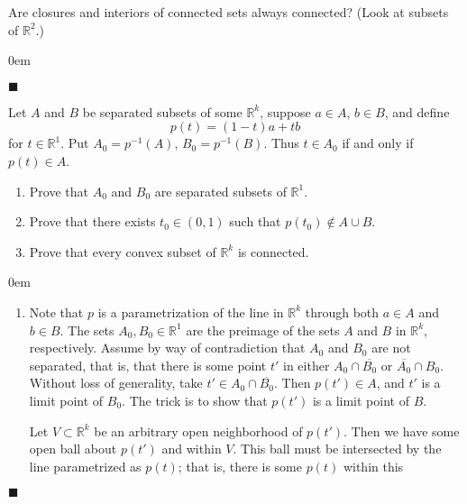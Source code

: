 \documentclass[12pt]{article}
\renewcommand{\qed}{\hfill$\blacksquare$}
\renewenvironment{proof}{\begin{addmargin}[1em]{0em}\begin{newproof}}{\end{newproof}\end{addmargin}\qed}
\newenvironment{problem}[2][Exercise]{\begin{trivlist}
\item[\hskip \labelsep {\bfseries #1}\hskip \labelsep {\bfseries #2.}]}{\end{trivlist}}
\begin{document}
\begin{problem}{2.20}
Are closures and interiors of connected sets always connected? (Look at subsets of $\mathbb{R}^2$.)
\end{problem}
\begin{proof}

\end{proof}





\begin{problem}{2.21}
Let $A$ and $B$ be separated subsets of some $\mathbb{R}^k$, suppose $a\in A$, $b \in B$, and define $$ p\left(t\right) = \left(1-t\right)a + tb$$ for $t \in \mathbb{R}^1$. Put $A_0 = p^{-1}\left(A\right)$, $B_0 = p^{-1}\left(B\right)$. Thus $t\in A_0$ if and only if $p\left(t\right) \in A$.
\begin{enumerate}[label=(\alph*)]
	\item Prove that $A_0$ and $B_0$ are separated subsets of $\mathbb{R}^1$. \\
	\item Prove that there exists $t_0 \in \left(0,1\right)$ such that $p\left(t_0\right) \notin A\cup B$. \\
	\item Prove that every convex subset of $\mathbb{R}^k$ is connected.
\end{enumerate}
\end{problem}
\begin{proof}
\begin{enumerate}[label=(\alph*)]
	\item Note that $p$ is a parametrization of the line in $\mathbb{R}^k$ through both $a\in A$ and $b\in B$. The sets $A_0, B_0 \in \mathbb{R}^1$ are the preimage of the sets $A$ and $B$ in $\mathbb{R}^k$, respectively. Assume by way of contradiction that $A_0$ and $B_0$ are not separated, that is, that there is some point $t'$ in either $A_0 \cap \overline{B_0}$ or $\overline{A_0}\cap B_0$. Without loss of generality, take $t' \in A_0 \cap \overline{B_0}$. Then $p\left(t'\right) \in A$, and $t'$ is a limit point of $B_0$.  The trick is to show that $p\left(t'\right)$ is a limit point of $B$.
	
	Let $V\subset \mathbb{R}^k$ be an arbitrary open neighborhood of $p\left(t'\right)$. Then we have some open ball about $p\left(t'\right)$ and within $V$. This ball must be intersected by the line parametrized as $p\left(t\right)$; that is, there is some $p\left(t\right)$ within this 
\end{enumerate}
\end{proof}
\end{document}
